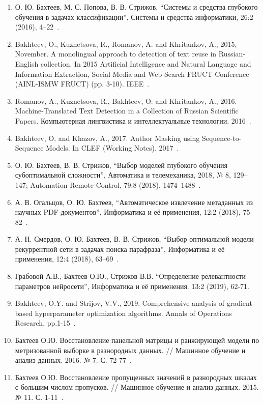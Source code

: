 \begin{enumerate}
\item О. Ю. Бахтеев, М. С. Попова, В. В. Стрижов, “Системы и средства глубокого обучения в задачах классификации”, Системы и средства информатики, 26:2 (2016), 4–22~\cite{popova2}.
\item Bakhteev, O., Kuznetsova, R., Romanov, A. and Khritankov, A., 2015, November. A monolingual approach to detection of text reuse in Russian-English collection. In 2015 Artificial Intelligence and Natural Language and Information Extraction, Social Media and Web Search FRUCT Conference (AINL-ISMW FRUCT) (pp. 3-10). IEEE~\cite{monolingual}.
\item Romanov, A., Kuznetsova, R., Bakhteev, O. and Khritankov, A., 2016. Machine-Translated Text Detection in a Collection of Russian Scientific Papers. Компьютерная лингвистика и интеллектуальные технологии. 2016~\cite{dialog}. 
\item Bakhteev, O. and Khazov, A., 2017. Author Masking using Sequence-to-Sequence Models. In CLEF (Working Notes). 2017~\cite{pan_s2s}.
\item О. Ю. Бахтеев, В. В. Стрижов, “Выбор моделей глубокого обучения субоптимальной сложности”, Автоматика и телемеханика, 2018, № 8, 129–147; Automation Remote Control, 79:8 (2018), 1474–1488~\cite{var_ait}.
\item А. В. Огальцов, О. Ю. Бахтеев, “Автоматическое извлечение метаданных из научных PDF-документов”, Информатика и её применения, 12:2 (2018), 75–82~\cite{ogaltsov}.
\item А. Н. Смердов, О. Ю. Бахтеев, В. В. Стрижов, “Выбор оптимальной модели рекуррентной сети в задачах поиска парафраза”, Информатика и её применения, 12:4 (2018), 63–69~\cite{smerdov}.
\item Грабовой А.В., Бахтеев О.Ю., Стрижов В.В. “Определение релевантности параметров нейросети”, Информатика и её применения. 13:2 (2019), 62-71.
\item Bakhteev, O.Y. and Strijov, V.V., 2019. Comprehensive analysis of gradient-based hyperparameter optimization algorithms. Annals of Operations Research, pp.1-15~\cite{hyper_bakhteev}.


\item Бахтеев О.Ю. Восстановление панельной матрицы и ранжирующей модели по метризованной выборке в разнородных данных. // Машинное обучение и анализ данных. 2016. № 7. С. 72-77~\cite{panel}.
\item Бахтеев О.Ю. Восстановление пропущенных значений в разнородных шкалах с большим числом пропусков. // Машинное обучение и анализ данных. 2015. № 11. С. 1-11~\cite{knn}.

\end{enumerate}


